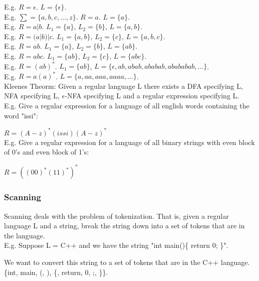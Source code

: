 \documentclass[12pt, letterpaper]{article}
\begin{document}
E.g. \(R = \epsilon\). \(L = \{\epsilon\}\).\\

E.g. \(\sum = \{a, b, c, ..., z\}\). \(R = a\). \(L = \{a\}\).\\

E.g. \(R = a|b\). \(L_1 = \{a\}\), \(L_2 = \{b\}\), \(L = \{a, b\}\).\\

E.g. \(R = (a|b)|c\). \(L_1 = \{a, b\}\), \(L_2 = \{c\}\), \(L = \{a, b, c\}\).\\

E.g. \(R = ab\). \(L_1 = \{a\}\), \(L_2 = \{b\}\), \(L = \{ab\}\).\\

E.g. \(R = abc\). \(L_1 = \{ab\}\), \(L_2 = \{c\}\), \(L = \{abc\}\).\\

E.g. \(R = (ab)^*\). \(L_1 = \{ab\}\), \(L = \{\epsilon, ab, abab, ababab, abababab, ...\}\).\\

E.g. \(R = a(a)^*\). \(L = \{a, aa, aaa, aaaa, ...\}\).\\

Kleenes Theorm: Given a regular language L there exists a DFA specifying L, NFA specifying L, \(\epsilon\)-NFA specifying L and a regular expression specifying L.\\

E.g. Give a regular expression for a language of all english words containing the word "issi":

\(R = (A-z)^*(issi)(A-z)^*\)\\

E.g. Give a regular expression for a language of all binary strings with even block of 0's and even block of 1's:

\(R = ((00)^*(11)^*)^*\)

\subsubsection{Scanning}
Scanning deals with the problem of tokenization. That is, given a regular language L and a string, break the string down into a set of tokens that are in the language.\\

E.g. Suppose L = C++ and we have the string "int main()\{ return 0; \}".

We want to convert this string to a set of tokens that are in the C++ language. \{int, main, (, ), \{, return, 0, ;, \}\}.\\
\end{document}
